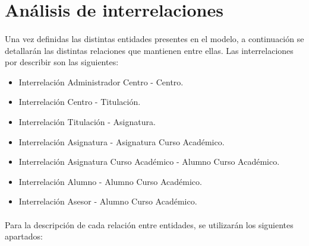 \section{Análisis de interrelaciones}

   \paragraph{}Una vez definidas las distintas entidades presentes en el
   modelo, a continuación se detallarán las distintas relaciones que mantienen
   entre ellas. Las interrelaciones por describir son las siguientes:

   \begin{itemize}
    \item Interrelación Administrador Centro - Centro.
    \item Interrelación Centro - Titulación.
    \item Interrelación Titulación - Asignatura.
    \item Interrelación Asignatura - Asignatura Curso Académico.
    \item Interrelación Asignatura Curso Académico - Alumno Curso Académico.
    \item Interrelación Alumno - Alumno Curso Académico.
    \item Interrelación Asesor - Alumno Curso Académico.
   \end{itemize}

   \paragraph{}Para la descripción de cada relación entre entidades, se
   utilizarán los siguientes apartados:

